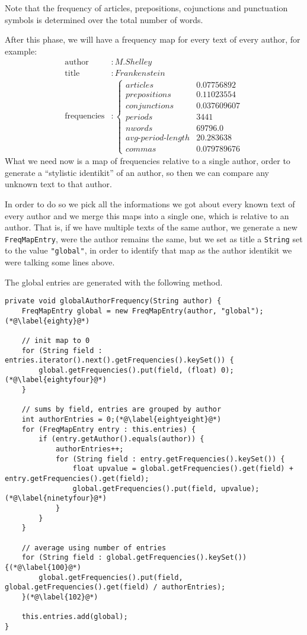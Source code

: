 \documentclass[a4paper,11pt, twoside]{article}
\begin{document}
	Note that the frequency of articles, prepositions, cojunctions and punctuation symbols is determined over the total number of words.
	
	After this phase, we will have a frequency map for every text of every author, for example: \begin{align*}
		\text{author}&: M. Shelley \\
		\text{title} &: Frankenstein \\
		\text{frequencies}&:\begin{cases}
			articles &0.07756892 \\
			prepositions &0.11023554 \\
			conjunctions &0.037609607 \\
			periods &3441 \\
			nwords &69796.0 \\
			avg\text{-}period\text{-}length &20.283638 \\
			commas &0.079789676 
		\end{cases}
	\end{align*}
	 What we need now is a map of frequencies relative to a single author, order to generate a ``stylistic identikit''  of an author, so then we can compare any unknown text to that author.
	 
	 In order to do so we pick all the informations we got about every known text of every author and we merge this maps into a single one, which is relative to an author. That is, if we have multiple texts of the same author, we generate a new \lstinline|FreqMapEntry|, were the author remains the same, but we set as title a \lstinline|String| set to the value \lstinline|"global"|, in order to identify that map as the author identikit we were talking some lines above.
	 
	 \bigskip
	 \noindent
	 The global entries are generated with the following method.
	 \begin{lstlisting}[firstnumber=79, caption={globalAuthorFrequency method}, captionpos=b]
private void globalAuthorFrequency(String author) {
	FreqMapEntry global = new FreqMapEntry(author, "global");(*@\label{eighty}@*)
	
	// init map to 0
	for (String field : entries.iterator().next().getFrequencies().keySet()) {
		global.getFrequencies().put(field, (float) 0);(*@\label{eightyfour}@*)
	}
	
	// sums by field, entries are grouped by author
	int authorEntries = 0;(*@\label{eightyeight}@*)
	for (FreqMapEntry entry : this.entries) {
		if (entry.getAuthor().equals(author)) {
			authorEntries++;
			for (String field : entry.getFrequencies().keySet()) {
				float upvalue = global.getFrequencies().get(field) + entry.getFrequencies().get(field);
				global.getFrequencies().put(field, upvalue);(*@\label{ninetyfour}@*)
			}
		}
	}
	
	// average using number of entries
	for (String field : global.getFrequencies().keySet()) {(*@\label{100}@*)
		global.getFrequencies().put(field, global.getFrequencies().get(field) / authorEntries);
	}(*@\label{102}@*)
	
	this.entries.add(global);
}
	 \end{lstlisting}
	 
\end{document}
